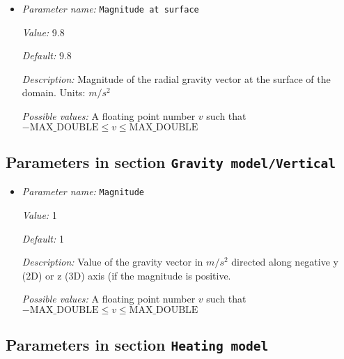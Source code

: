 \begin{itemize}
\item {\it Parameter name:} {\tt Magnitude at surface}
\label{parameters:Gravity model/Radial linear/Magnitude at surface}


{\it Value:} 9.8


{\it Default:} 9.8


{\it Description:} Magnitude of the radial gravity vector at the surface of the domain. Units: $m/s^2$


{\it Possible values:} A floating point number $v$ such that $-\text{MAX\_DOUBLE} \leq v \leq \text{MAX\_DOUBLE}$
\end{itemize}

\subsection{Parameters in section \tt Gravity model/Vertical}
\label{parameters:Gravity_20model/Vertical}

\begin{itemize}
\item {\it Parameter name:} {\tt Magnitude}
\label{parameters:Gravity model/Vertical/Magnitude}


{\it Value:} 1


{\it Default:} 1


{\it Description:} Value of the gravity vector in $m/s^2$ directed along negative y (2D) or z (3D) axis (if the magnitude is positive.


{\it Possible values:} A floating point number $v$ such that $-\text{MAX\_DOUBLE} \leq v \leq \text{MAX\_DOUBLE}$
\end{itemize}

\subsection{Parameters in section \tt Heating model}
\label{parameters:Heating_20model}

